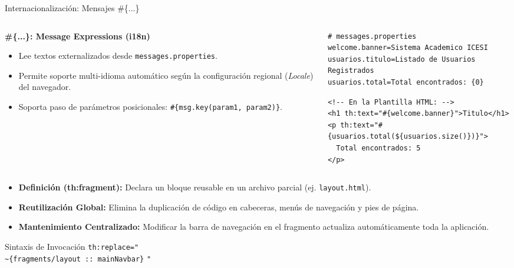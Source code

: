 \documentclass[aspectratio=169]{beamer}
\begin{document}
\begin{frame}[fragile]{Internacionalizaci\'on: Mensajes \#\{...\}}
\begin{columns}[T]
\begin{column}{0.48\textwidth}
  \textbf{\#\{...\}: Message Expressions (i18n)}
  \begin{itemize}
    \item Lee textos externalizados desde \texttt{messages.properties}.
    \item Permite soporte multi-idioma autom\'atico seg\'un la configuraci\'on regional (\textit{Locale}) del navegador.
    \item Soporta paso de par\'ametros posicionales: \texttt{\#\{msg.key(param1, param2)\}}.
  \end{itemize}
\end{column}
\begin{column}{0.50\textwidth}
\begin{lstlisting}[style=PropertiesStyle]
# messages.properties
welcome.banner=Sistema Academico ICESI
usuarios.titulo=Listado de Usuarios Registrados
usuarios.total=Total encontrados: {0}
\end{lstlisting}
\begin{lstlisting}[style=ThymeleafStyle]
<!-- En la Plantilla HTML: -->
<h1 th:text="#{welcome.banner}">Titulo</h1>
<p th:text="#{usuarios.total(${usuarios.size()})}">
  Total encontrados: 5
</p>
\end{lstlisting}
\end{column}
\end{columns}
\end{frame}

  {
    \begin{itemize}
      \item \textbf{Definici\'on (th:fragment):} Declara un bloque reusable en un archivo parcial (ej. \texttt{layout.html}).
      \item \textbf{Reutilizaci\'on Global:} Elimina la duplicaci\'on de c\'odigo en cabeceras, men\'us de navegaci\'on y pies de p\'agina.
      \item \textbf{Mantenimiento Centralizado:} Modificar la barra de navegaci\'on en el fragmento actualiza autom\'aticamente toda la aplicaci\'on.
    \end{itemize}
  }
  {Sintaxis de Invocaci\'on}
  {\texttt{th:replace="}\\\texttt{\textasciitilde\{fragments/layout :: mainNavbar\}} \texttt{"}}
\end{document}
